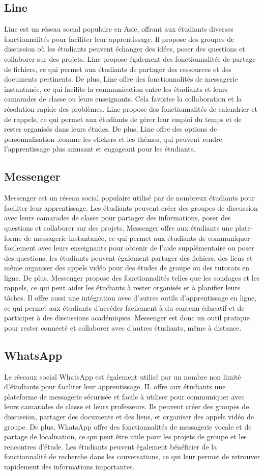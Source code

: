 \documentclass[12pt,a4paper,titlepage]{article}
\begin{document}
\subsection{Line}
Line est un réseau social populaire en Asie, offrant aux étudiants diverses fonctionnalités pour faciliter leur apprentissage. Il propose des groupes de discussion où les étudiants peuvent échanger des idées, poser des questions et collaborer sur des projets. Line propose également des fonctionnalités de partage de fichiers, ce qui permet aux étudiants de partager des ressources et des documents pertinents. De plus, Line offre des fonctionnalités de messagerie instantanée, ce qui facilite la communication entre les étudiants et leurs camarades de classe ou leurs enseignants. Cela favorise la collaboration et la résolution rapide des problèmes. Line propose des fonctionnalités de calendrier et de rappels, ce qui permet aux étudiants de gérer leur emploi du temps et de rester organisés dans leurs études. De plus, Line offre des options de personnalisation ,comme les stickers et les thèmes, qui peuvent rendre l'apprentissage plus amusant et engageant pour les étudiants.
\subsection{Messenger }
Messenger est un réseau social populaire utilisé par de nombreux étudiants pour faciliter leur apprentissage. Les étudiants peuvent créer des groupes de discussion avec leurs camarades de classe pour partager des informations, poser des questions et collaborer sur des projets. Messenger offre aux étudiants une plate-forme de messagerie instantanée, ce qui permet aux étudiants de communiquer facilement avec leurs enseignants pour obtenir de l'aide supplémentaire ou poser des questions.  les étudiants peuvent également partager des fichiers, des liens et même organiser des appels vidéo pour des études de groupe ou des tutorats en ligne. De plus, Messenger propose des fonctionnalités telles que les sondages et les rappels, ce qui peut aider les étudiants à rester organisés et à planifier leurs tâches. Il offre aussi une intégration avec d'autres outils d'apprentissage en ligne, ce qui permet aux étudiants d'accéder facilement à du contenu éducatif et de participer à des discussions académiques. Messenger est donc un outil pratique pour rester connecté et collaborer avec d'autres étudiants, même à distance.
\subsection{WhatsApp}
Le réseaux social WhatsApp est également utilisé par un nombre non limité d’étudiants pour faciliter leur apprentissage. IL offre aux étudiants une plateforme de messagerie sécurisée et facile à utiliser pour communiquer avec leurs camarades de classe et leurs professeurs. Ils peuvent créer des groupes de discussion, partager des documents et des liens, et organiser des appels vidéo de groupe. De plus, WhatsApp offre des fonctionnalités de messagerie vocale et de partage de localisation, ce qui peut être utile pour les projets de groupe et les rencontres d'étude. Les étudiants peuvent également bénéficier de la fonctionnalité de recherche dans les conversations, ce qui leur permet de retrouver rapidement des informations importantes.
\end{document}
